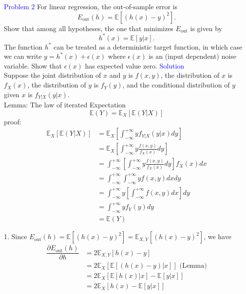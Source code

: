\textcolor{blue}{Problem 2}
For linear regression, the out-of-sample error is 
\begin{equation}
    E_{\text{out}}(h)=\mathbb{E}[{(h(x)-y)}^2].
\end{equation}
Show that among all hypotheses, the one that minimizes $E_{\text{out}}$ is given by
\begin{equation}
    h^*(x)=\mathbb{E}[y|x].
\end{equation}
The function $h^*$ can be treated as a deterministic target function, in which case we can write $y=h^*(x)+\epsilon(x)$ where $\epsilon(x)$ is an (input dependent) noise variable. Show that $\epsilon(x)$ has expected value zero.
\newline
\textcolor{blue}{Solution}\\
Suppose the joint distribution of $x$ and $y$ is $f(x, y)$, the distribution of $x$ is $f_X(x)$, the distribution of $y$ is $f_Y(y)$, and the conditional distribution of $y$ given $x$ is $f_{Y|X}(y|x)$.\\

Lemma: The law of iterated Expectation
$$\mathbb{E}(Y)=\mathbb{E}_X[\mathbb{E}(Y|X)]$$
proof:
\begin{align*}
\mathbb{E}_X[\mathbb{E}(Y|X)] &= \mathbb{E}_X\left[\int_{-\infty}^{+\infty} y f_{Y|X}(y|x) d y\right] \\
&= \mathbb{E}_X\left[\int_{-\infty}^{+\infty} y \frac{f(x, y)}{f_X(x)} d y\right] \\
&=\int_{-\infty}^{+\infty}\left[\int_{-\infty}^{+\infty} y \frac{f(x, y)}{f_X(x)} d y\right] f_X(x) d x \\
&=\int_{-\infty}^{+\infty} \int_{-\infty}^{+\infty} y f(x, y) d x d y \\
&=\int_{-\infty}^{+\infty} y\left[\int_{-\infty}^{+\infty} f(x, y) d x\right] d y \\
&=\int_{-\infty}^{+\infty} y f_Y(y) d y \\
&=\mathbb{E}(Y)
\end{align*}

1. Since $E_{\text{out}}(h)=\mathbb{E}[{(h(x)-y)}^2]=\mathbb{E}_{X,Y}[{(h(x)-y)}^2]$, we have
\begin{align*}
    \dfrac{\partial E_{\text{out}}(h)}{\partial h} &= 2 \mathbb{E}_{X,Y}[h(x)-y] \\
    &= 2 \mathbb{E}_X\left[\mathbb{E}\left[(h(x)-y)|x\right]\right] \text{\ \ \ \ \ \ \ (Lemma)} \\
    &= 2 \mathbb{E}_X\left[\mathbb{E}\left[h(x)|x\right]-\mathbb{E}\left[y|x\right]\right] \\
    &= 2 \mathbb{E}_X\left[h(x)-\mathbb{E}\left[y|x\right]\right]
\end{align*}

